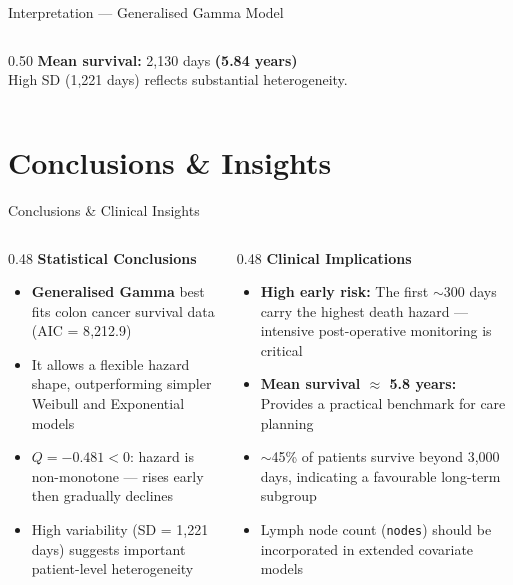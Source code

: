 \documentclass[aspectratio=169, 11pt]{beamer}
\begin{document}
\begin{frame}{Interpretation --- Generalised Gamma Model}
\begin{columns}[T]
\begin{column}{0.50\textwidth}
    \vspace{8pt}
    \textbf{Mean survival:} 2{,}130 days \textbf{(5.84 years)}\\
    High SD (1{,}221 days) reflects substantial heterogeneity.
  \end{column}

\end{columns}
\end{frame}

\section{Conclusions \& Insights}
\begin{frame}{Conclusions \& Clinical Insights}

\begin{columns}[T]

  \begin{column}{0.48\textwidth}
    \textbf{Statistical Conclusions}
    \vspace{4pt}
    \begin{itemize}
      \small
      \item \textbf{Generalised Gamma} best fits colon cancer
            survival data (AIC = 8{,}212.9)
      \item It allows a flexible hazard shape, outperforming
            simpler Weibull and Exponential models
      \item $Q = -0.481 < 0$: hazard is non-monotone ---
            rises early then gradually declines
      \item High variability (SD = 1{,}221 days) suggests
            important patient-level heterogeneity
    \end{itemize}
  \end{column}

  \begin{column}{0.48\textwidth}
    \textbf{Clinical Implications}
    \vspace{4pt}
    \begin{itemize}
      \small
      \item \textbf{High early risk:} The first $\sim$300 days
            carry the highest death hazard --- intensive
            post-operative monitoring is critical
      \item \textbf{Mean survival $\approx$ 5.8 years:}
            Provides a practical benchmark for care planning
      \item $\sim$45\% of patients survive beyond 3{,}000 days,
            indicating a favourable long-term subgroup
      \item Lymph node count (\texttt{nodes}) should be
            incorporated in extended covariate models
    \end{itemize}
  \end{column}


\end{columns}
\end{frame}
\end{document}
